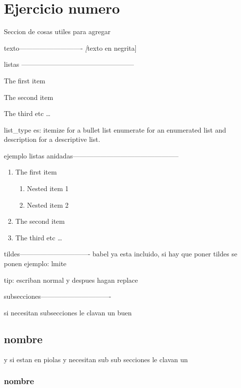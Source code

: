 \ifunoporpagina
\newpage
\fi
\section*{Ejercicio numero}

\iffalse
Seccion de cosas utiles para agregar

texto----------------------------
\textit[texto en negrita]




listas --------------------------------------------------
\begin{list_type}  
\item The first item 
\item The second item 
\item The third etc \ldots 
\end{list_type}

list_type es:
itemize for a bullet list
enumerate for an enumerated list and
description for a descriptive list.

ejemplo listas anidadas-----------------------------------------------

\begin{enumerate}
\item The first item
\begin{enumerate}
\item Nested item 1
\item Nested item 2
\end{enumerate}
\item The second item
\item The third etc \ldots
\end{enumerate}

tildes-------------------------------
babel ya esta incluido, si hay que poner tildes se ponen 
ejemplo: lmite

tip: escriban normal y despues hagan replace

subsecciones-------------------------------

si necesitan subsecciones le clavan un buen \subsection*{nombre}

y si estan en piolas y necesitan sub sub secciones le clavan un \subsubsection*{nombre}

